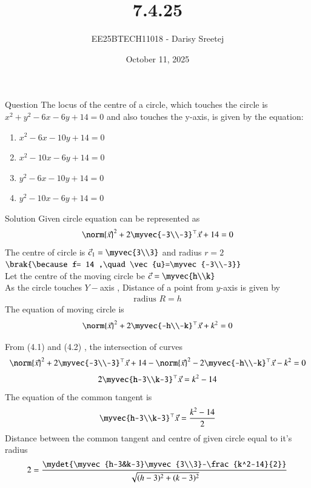 \documentclass{beamer}
\title %
{7.4.25}
\date{October 11, 2025}
\author %
{EE25BTECH11018 - Darisy Sreetej}
\begin{document}
\frame{\titlepage}

\begin{frame}{Question}
The locus of the centre of a circle, which touches the circle is $x^2 + y^2 -6x -6y +14 =0$ and also touches the y-axis, is given by the equation:
\begin{enumerate}
    \item $x^2-6x-10y+14=0$
    \item $x^2-10x-6y+14=0$
    \item $y^2-6x-10y+14=0$
    \item $y^2-10x-6y+14=0$
\end{enumerate}
\end{frame}
\begin{frame}{Solution}
Given circle equation can be represented as
\begin{align}
    \norm{\vec{x}}^2+2\myvec{-3\\-3}^\top\vec{x}+14=0
\end{align}
The centre of circle is $\vec{c}_1=\myvec{3\\3}$ and radius $r=2$ $\brak{\because f= 14 ,\quad \vec{u}=\myvec{-3\\-3}} $\\
Let the centre of the moving circle be $\vec{c}=\myvec{h\\k}$\\
As the circle touches $Y-$axis , Distance of a point from $y$-axis is given by
\begin{align*}
  \text{radius }  R=h
\end{align*}
The equation of moving circle is 
\begin{align}
    \norm{\vec{x}}^2+2\myvec{-h\\-k}^\top\vec{x}+k^2=0
\end{align}
\end{frame}
\begin{frame}
From (4.1) and (4.2) , the intersection of curves
\begin{align}
    \norm{\vec{x}}^2+2\myvec{-3\\-3}^\top\vec{x}+14 -  \norm{\vec{x}}^2-2\myvec{-h\\-k}^\top\vec{x}-k^2 =0 
    \end{align}
    \begin{align}
    2\myvec{h-3\\k-3}^\top\vec{x}= k^2-14
\end{align}The equation of the common tangent is 
\begin{align}
\myvec{h-3\\k-3}^\top\vec{x}= \frac{k^2-14}{2}
\end{align}
Distance between the common tangent and centre of given circle equal to it's radius
\begin{align}
 2=\frac{\mydet{\myvec{h-3&k-3}\myvec{3\\3}-\frac{k^2-14}{2}}}{\sqrt{(h-3)^2 + (k-3)^2}}
\end{align}
\end{frame}
\end{document}
